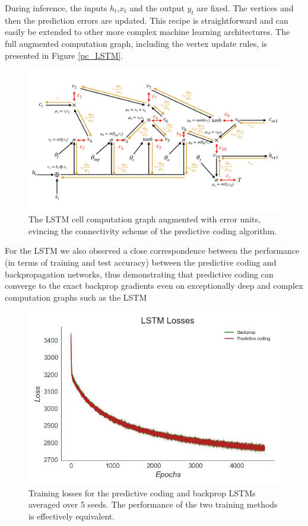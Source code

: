 During inference, the inputs $h_t$,$x_t$ and the output $y_t$ are fixed. The vertices and then the prediction errors are updated. This recipe is straightforward and can easily be extended to other more complex machine learning architectures. The full augmented computation graph, including the vertex update rules, is presented in Figure \ref{pc_LSTM}.


\begin{figure}%
\label{pc_lstm}
  \centering
  \includegraphics[width=1\linewidth]{chapter_6_figures/pc_LSTM.pdf}  
\caption{The LSTM cell computation graph augmented with error units, evincing the connectivity scheme of the predictive coding algorithm.}
\end{figure}

For the LSTM we also observed a close correspondence between the performance (in terms of training and test accuracy) between the predictive coding and backpropagation networks, thus demonstrating that predictive coding can converge to the exact backprop gradients even on exceptionally deep and complex computation graphs such as the LSTM

\begin{figure}[ht]
\label{sequence_length_effect}
  \centering
  \includegraphics[width=0.7\linewidth]{chapter_6_figures/LSTM_Losses_super_prelim_6.jpg}  
\caption{Training losses for the predictive coding and backprop LSTMs averaged over 5 seeds. The performance of the two training methods is effectively equivalent.}
\end{figure}

